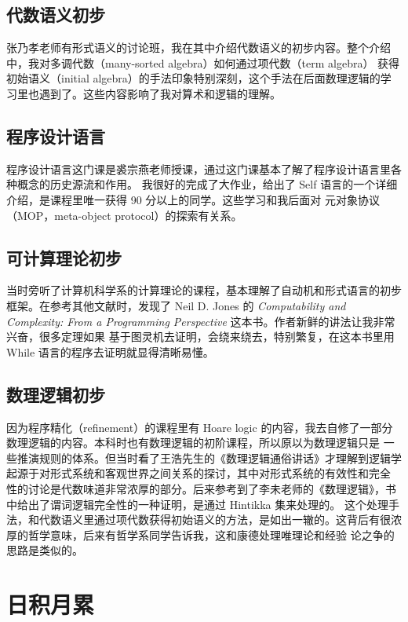 \documentclass[a4paper,12pt]{article}
\numberwithin{problem}{section}
\numberwithin{definition}{section}
\numberwithin{lemma}{section}
\numberwithin{proposition}{section}
\numberwithin{theorem}{section}
\numberwithin{grammar}{section}
\numberwithin{program}{section}
\numberwithin{convention}{section}
\numberwithin{corollary}{section}
\begin{document}
\subsection{代数语义初步}

张乃孝老师有形式语义的讨论班，我在其中介绍代数语义的初步内容。整个介绍中，我对多调代数（many-sorted algebra）如何通过项代数（term algebra）
获得初始语义（initial algebra）的手法印象特别深刻，这个手法在后面数理逻辑的学习里也遇到了。这些内容影响了我对算术和逻辑的理解。

\subsection{程序设计语言}

程序设计语言这门课是裘宗燕老师授课，通过这门课基本了解了程序设计语言里各种概念的历史源流和作用。
我很好的完成了大作业，给出了 Self 语言的一个详细介绍，是课程里唯一获得 90 分以上的同学。这些学习和我后面对
元对象协议（MOP，meta-object protocol）的探索有关系。

\subsection{可计算理论初步}

当时旁听了计算机科学系的计算理论的课程，基本理解了自动机和形式语言的初步框架。在参考其他文献时，发现了 Neil D. Jones 的
\textit{Computability and Complexity: From a Programming Perspective} 这本书。作者新鲜的讲法让我非常兴奋，很多定理如果
基于图灵机去证明，会绕来绕去，特别繁复，在这本书里用 While 语言的程序去证明就显得清晰易懂。

\subsection{数理逻辑初步}

因为程序精化（refinement）的课程里有 Hoare logic 的内容，我去自修了一部分数理逻辑的内容。本科时也有数理逻辑的初阶课程，所以原以为数理逻辑只是
一些推演规则的体系。但当时看了王浩先生的《数理逻辑通俗讲话》才理解到逻辑学起源于对形式系统和客观世界之间关系的探讨，其中对形式系统的有效性和完全
性的讨论是代数味道非常浓厚的部分。后来参考到了李未老师的《数理逻辑》，书中给出了谓词逻辑完全性的一种证明，是通过 Hintikka 集来处理的。
这个处理手法，和代数语义里通过项代数获得初始语义的方法，是如出一辙的。这背后有很浓厚的哲学意味，后来有哲学系同学告诉我，这和康德处理唯理论和经验
论之争的思路是类似的。

\section{日积月累}
\end{document}
